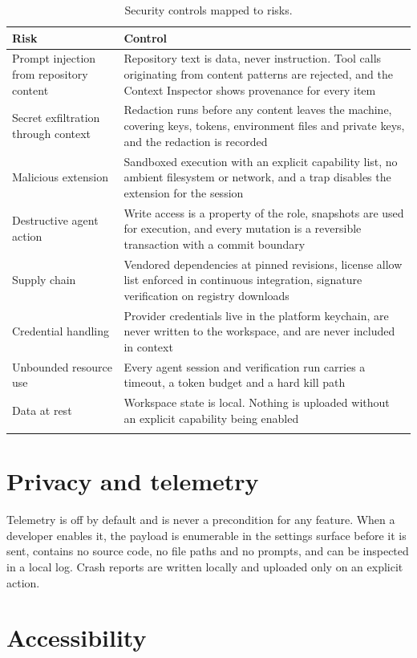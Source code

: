 \begin{longtable}{@{}p{} p{}@{}}
\toprule
\textbf{Risk} & \textbf{Control} \\
\midrule
\endhead
Prompt injection from repository content & Repository text is data, never instruction. Tool calls originating from content patterns are rejected, and the Context Inspector shows provenance for every item \\
Secret exfiltration through context & Redaction runs before any content leaves the machine, covering keys, tokens, environment files and private keys, and the redaction is recorded \\
Malicious extension & Sandboxed execution with an explicit capability list, no ambient filesystem or network, and a trap disables the extension for the session \\
Destructive agent action & Write access is a property of the role, snapshots are used for execution, and every mutation is a reversible transaction with a commit boundary \\
Supply chain & Vendored dependencies at pinned revisions, license allow list enforced in continuous integration, signature verification on registry downloads \\
Credential handling & Provider credentials live in the platform keychain, are never written to the workspace, and are never included in context \\
Unbounded resource use & Every agent session and verification run carries a timeout, a token budget and a hard kill path \\
Data at rest & Workspace state is local. Nothing is uploaded without an explicit capability being enabled \\
\bottomrule
\caption{Security controls mapped to risks.}
\end{longtable}

\section{Privacy and telemetry}

Telemetry is off by default and is never a precondition for any feature. When a developer
enables it, the payload is enumerable in the settings surface before it is sent, contains no
source code, no file paths and no prompts, and can be inspected in a local log. Crash reports
are written locally and uploaded only on an explicit action.

\section{Accessibility}

